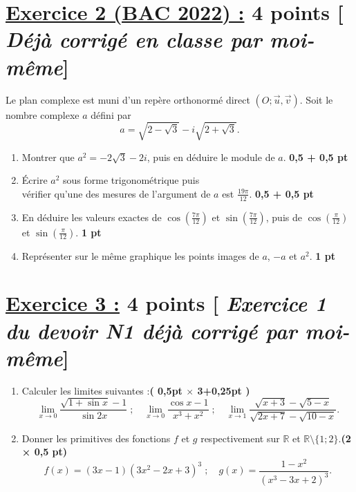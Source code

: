 \documentclass[12pt,a4paper]{article}
\begin{document}
\section*{\underline{Exercice 2 (BAC 2022) :} 4 points [\textit{ Déjà corrigé en classe par moi-même}]}
Le plan complexe est muni d’un repère orthonormé direct $(O; \vec{u}, \vec{v})$. Soit le nombre complexe $a$ défini par 
\[
a = \sqrt{2 - \sqrt{3}} - i\sqrt{2 + \sqrt{3}}.
\]

\begin{enumerate}
    \item Montrer que $a^2 = -2\sqrt{3} - 2i$, puis en déduire le module de $a$. \hfill \textbf{0,5 + 0,5 pt}

    \item Écrire $a^2$ sous forme trigonométrique puis \\vérifier qu’une des mesures de l’argument de $a$ est $\frac{19\pi}{12}$. \hfill \textbf{0,5 + 0,5 pt}

    \item En déduire les valeurs exactes de $\cos\left(\frac{7\pi}{12}\right)$ et $\sin\left(\frac{7\pi}{12}\right)$, puis de $\cos\left(\frac{\pi}{12}\right)$ et $\sin\left(\frac{\pi}{12}\right)$. \hfill \textbf{1 pt}

    \item Représenter sur le même graphique les points images de $a$, $-a$ et $a^2$. \hfill \textbf{1 pt}
\end{enumerate}
\section*{\underline{Exercice 3 :} 4 points [\textit{ Exercice 1  du devoir N1 déjà  corrigé par moi-même}]}

\begin{enumerate}
    \item Calculer les limites suivantes :\hfill \textbf{( 0,5pt $\times$ 3+0,25pt )}
    \[
    \lim_{x \to 0} \frac{\sqrt{1+\sin x} - 1}{\sin 2x} \; ; \quad
    \lim_{x \to 0} \frac{\cos x - 1}{x^3 + x^2} \; ; \quad
    \lim_{x \to 1} \frac{\sqrt{x + 3} - \sqrt{5 - x}}{\sqrt{2x + 7} - \sqrt{10 - x}}.
    \]
    \item Donner les primitives des fonctions \(f\) et \(g\) respectivement sur \(\mathbb{R}\) et \(\mathbb{R} \setminus \{1; 2\}\).\hfill \textbf{(2 × 0,5 pt)}
    \[
    f(x) = (3x-1)(3x^2-2x+3)^3 \; ; \quad
    g(x) = \frac{1-x^2}{(x^3-3x+2)^3}.
    \]
\end{enumerate}
\end{document}
